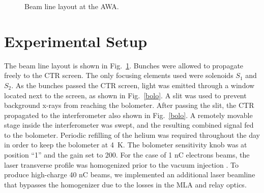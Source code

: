 \documentclass[letterpaper,  %
              ]{jacow-2_3}   %
\begin{document}
\begin{figure}[hbt]
	\centering
	\begin{tikzpicture}[scale=0.8, text=black]
	
	\end{tikzpicture}	
	\caption{Beam line layout at the AWA.}
	\label{beamline}
\end{figure}
\section{Experimental Setup}
The beam line layout is shown in Fig.~\ref{beamline}. 
Bunches were allowed to propagate freely to the 
CTR screen. The only focusing elements used were solenoids $S_1$ and
$S_2$. As the bunches passed the CTR screen, light was
emitted through a window located next to the screen, 
as shown in Fig.~\ref{bolo}. A slit was used to prevent
background x-rays from reaching the bolometer.
After passing the slit, the CTR propagated to the 
 interferometer also shown in Fig.~\ref{bolo}. 
A remotely movable stage inside the interferometer was swept, 
and the resulting combined signal fed to the bolometer. 
Periodic refilling of the helium was required throughout the day in order
to keep the bolometer at \SI{4}{K}. The bolometer sensitivity knob was at position ``1'' and
the gain set to 200.
For the case of 1 nC electrons beams, the laser transverse profile was homogenized prior to the vacuum injection \cite{PhysRevAccelBeams.20.103404}.
To produce high-charge 40 nC beams, we implemented an additional laser beamline that bypasses the homogenizer due to the losses in the 
MLA and relay optics.
\end{document}
